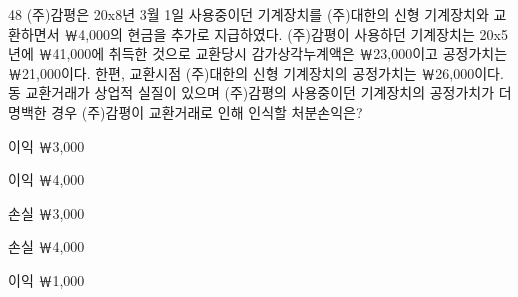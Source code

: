 \begin{question}{48}
(주)감평은 20x8년 3월 1일 사용중이던 기계장치를 (주)대한의 신형 기계장치와 교환하면서 ￦4,000의 현금을 추가로 지급하였다. (주)감평이 사용하던 기계장치는 20x5년에 ￦41,000에 취득한 것으로 교환당시 감가상각누계액은 ￦23,000이고 공정가치는 ￦21,000이다. 한편, 교환시점 (주)대한의 신형 기계장치의 공정가치는 ￦26,000이다. 동 교환거래가 상업적 실질이 있으며 (주)감평의 사용중이던 기계장치의 공정가치가 더 명백한 경우 (주)감평이 교환거래로 인해 인식할 처분손익은?
\begin{choices}
  \item 이익 ￦3,000
  \item 이익 ￦4,000
  \item 손실 ￦3,000
  \item 손실 ￦4,000
  \item 이익 ￦1,000
\end{choices}
\end{question}
